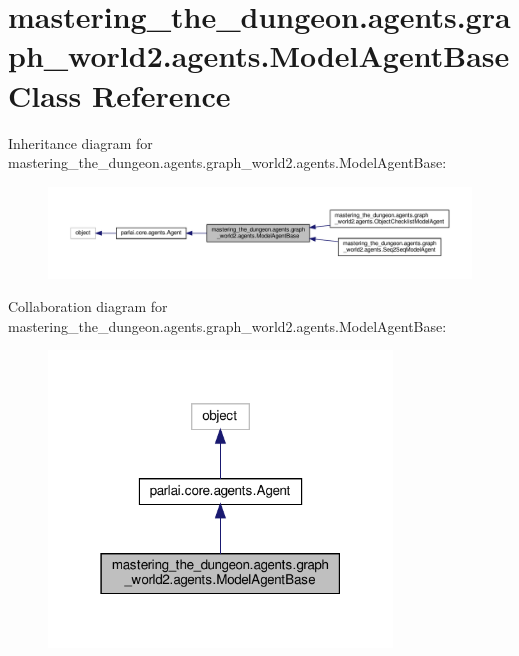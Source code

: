 \hypertarget{classmastering__the__dungeon_1_1agents_1_1graph__world2_1_1agents_1_1ModelAgentBase}{}\section{mastering\+\_\+the\+\_\+dungeon.\+agents.\+graph\+\_\+world2.\+agents.\+Model\+Agent\+Base Class Reference}
\label{classmastering__the__dungeon_1_1agents_1_1graph__world2_1_1agents_1_1ModelAgentBase}


Inheritance diagram for mastering\+\_\+the\+\_\+dungeon.\+agents.\+graph\+\_\+world2.\+agents.\+Model\+Agent\+Base\+:
\nopagebreak
\begin{figure}[H]
\begin{center}
\leavevmode
\includegraphics[width=350pt]{classmastering__the__dungeon_1_1agents_1_1graph__world2_1_1agents_1_1ModelAgentBase__inherit__graph}
\end{center}
\end{figure}


Collaboration diagram for mastering\+\_\+the\+\_\+dungeon.\+agents.\+graph\+\_\+world2.\+agents.\+Model\+Agent\+Base\+:
\nopagebreak
\begin{figure}[H]
\begin{center}
\leavevmode
\includegraphics[width=259pt]{classmastering__the__dungeon_1_1agents_1_1graph__world2_1_1agents_1_1ModelAgentBase__coll__graph}
\end{center}
\end{figure}

